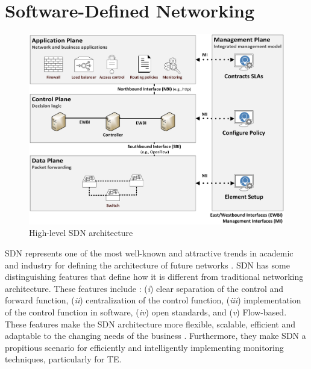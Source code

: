 \section{Software-Defined Networking}
\label{sec:background-sdn}

\begin{figure}[!ht]
    \centering
    \includegraphics[scale=0.45]{figures/Figure_0_SDN_architecture}
    \caption{High-level SDN architecture}
    \label{fig:sdn_architecture}
\end{figure}

SDN represents one of the most well-known and attractive trends in academic and industry for defining the architecture of future networks \cite{ESTRADASOLANO2017150, feamster_2014:road_sdn}. SDN has some distinguishing features that define how it is different from traditional networking architecture. These features include \cite{kreutz_2015:sdn_comprehensive_survey, nunes_2014:survey_past_present_future}: (\textit{i}) clear separation of the control and forward function, (\textit{ii}) centralization of the control function, (\textit{iii}) implementation of the control function in software, (\textit{iv}) open standards, and (\textit{v}) Flow-based. These features make the SDN architecture more flexible, scalable, efficient and adaptable to the changing needs of the business \cite{herrera_2016:nfv_survey}. Furthermore, they make SDN a propitious scenario for efficiently and intelligently implementing monitoring techniques, particularly for TE.\\

